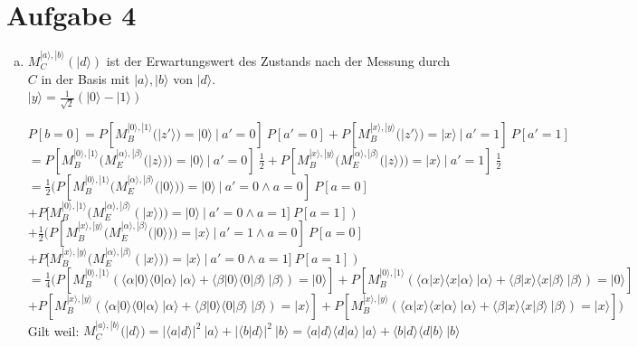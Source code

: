 \documentclass[a4paper]{scrartcl}
\begin{document}
\newpage
\section*{Aufgabe 4}
\begin{enumerate}[a)]

\item $M_C^{|a\rangle,|b\rangle}(|d\rangle)$ ist der Erwartungswert des Zustands nach der Messung durch $C$ in der Basis mit $|a\rangle,|b\rangle$ von $|d\rangle$.\\
$|y\rangle = \frac{1}{\sqrt{2}} (|0\rangle -|1\rangle)$

$P[b=0] = P[M_B^{|0\rangle,|1\rangle}(|z'\rangle)=|0\rangle~|~a'=0]~P[a'=0] + P[M_B^{|x\rangle,|y\rangle}(|z'\rangle)=|x\rangle~|~a'=1]~P[a'=1]$\\
$=P[M_B^{|0\rangle,|1\rangle}(M_E^{|\alpha\rangle,|\beta\rangle}(|z\rangle))=|0\rangle~|~a'=0]~\frac{1}{2} + P[M_B^{|x\rangle,|y\rangle}(M_E^{|\alpha\rangle,|\beta\rangle}(|z\rangle))=|x\rangle~|~a'=1]~\frac{1}{2}$\\
$=\frac{1}{2} (P[M_B^{|0\rangle,|1\rangle}(M_E^{|\alpha\rangle,|\beta\rangle}(|0\rangle))=|0\rangle~|~a'=0 \wedge a=0]~P[a=0]$\\
$+ P[M_B^{|0\rangle,|1\rangle}(M_E^{|\alpha\rangle,|\beta\rangle}(|x\rangle))=|0\rangle~|~a'=0 \wedge a=1]~P[a=1])$\\
$+\frac{1}{2} (P[M_B^{|x\rangle,|y\rangle}(M_E^{|\alpha\rangle,|\beta\rangle}(|0\rangle))=|x\rangle~|~a'=1 \wedge a=0]~P[a=0]$\\
$+ P[M_B^{|x\rangle,|y\rangle}(M_E^{|\alpha\rangle,|\beta\rangle}(|x\rangle))=|x\rangle~|~a'=0 \wedge a=1]~P[a=1])$\\
$=\frac{1}{4} (P[M_B^{|0\rangle,|1\rangle}(\langle \alpha|0\rangle \langle 0|\alpha\rangle~|\alpha\rangle + \langle \beta|0\rangle \langle 0|\beta\rangle~|\beta\rangle)=|0\rangle] + P[M_B^{|0\rangle,|1\rangle}(\langle \alpha|x\rangle \langle x|\alpha\rangle~|\alpha\rangle + \langle \beta|x\rangle \langle x|\beta\rangle~|\beta\rangle)=|0\rangle]$\\
$+ P[M_B^{|x\rangle,|y\rangle}(\langle \alpha|0\rangle \langle 0|\alpha\rangle~|\alpha\rangle + \langle \beta|0\rangle \langle 0|\beta\rangle~|\beta\rangle)=|x\rangle] + P[M_B^{|x\rangle,|y\rangle}(\langle \alpha|x\rangle \langle x|\alpha\rangle~|\alpha\rangle + \langle \beta|x\rangle \langle x|\beta\rangle~|\beta\rangle)=|x\rangle])$\\
Gilt weil: $M_C^{|a\rangle,|b\rangle}(|d\rangle) = |\langle a|d\rangle|^2~|a\rangle + |\langle b|d\rangle|^2~|b\rangle =\langle a|d\rangle \langle d|a\rangle~|a\rangle + \langle b|d\rangle \langle d|b\rangle~|b\rangle$\\\\

\end{enumerate}
\end{document}
